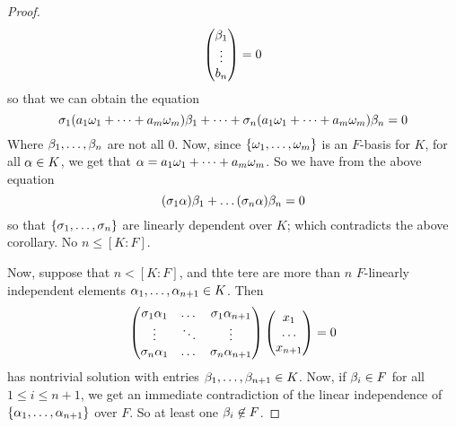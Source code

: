\begin{proof}
\begin{equation*}
\begin{pmatrix}
            \beta_1    \\  \vdots  \\  b_n \\
        \end{pmatrix}
        =0
    \end{equation*}
    so that we can obtain the equation
    \begin{equation*}
        \sigma_1(a_1\omega_1+\dots+a_m\omega_m)\beta_1+\dots+\sigma_n(a_1\omega_1+\dots+a_m\omega_m)\beta_n=0
    \end{equation*}
    Where $\beta_1, \dots, \beta_n$ are not all $0$. Now, since  $\{\omega_1, \dots,
    \omega_m\}$ is an $F$-basis for  $K$, for all  $\alpha \in K$, we get that
    $\alpha=a_1\omega_1+\dots+a_m\omega_m$. So we have from the above equation
    \begin{equation*}
        (\sigma_1\alpha)\beta_1+\dots(\sigma_n\alpha)\beta_n=0
    \end{equation*}
    so that $\{\sigma_1, \dots, \sigma_n\}$ are linearly dependent over $K$; which
    contradicts the above corollary. No $n \leq [K:F]$.

    Now, suppose that $n<[K:F]$, and thte tere are more than $n$  $F$-linearly
    independent elements  $\alpha_1, \dots, \alpha_{n+1} \in K$. Then
    \begin{equation*}
        \begin{pmatrix}
            \sigma_1\alpha_1    &   \dots   &   \sigma_1\alpha_{n+1}    \\
            \vdots  &   \ddots  &   \vdots  \\
            \sigma_n\alpha_1    &   \dots   &   \sigma_n\alpha_{n+1}
        \end{pmatrix}
        \begin{pmatrix}
            x_1 \\  \dots   \\  x_{n+1}
        \end{pmatrix}
        =0
    \end{equation*}
    has nontrivial solution with entries $\beta_1, \dots, \beta_{n+1} \in K$. Now, if
    $\beta_i \in F$ for all $1 \leq i \leq n+1$, we get an immediate contradiction
    of the linear independence of  $\{\alpha_1, \dots, \alpha_{n+1}\}$ over $F$. So at
    least one  $\beta_i \not\in F$.


\end{proof}
